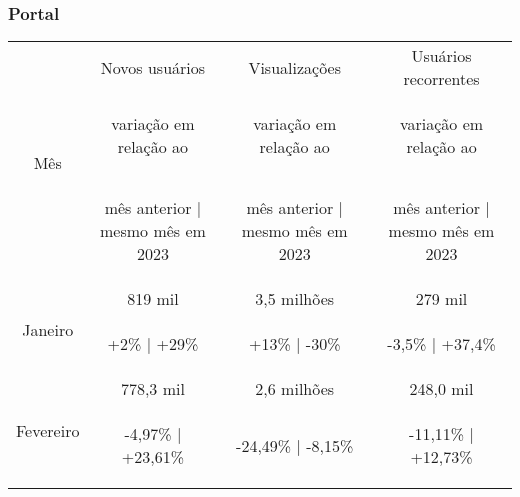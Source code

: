 \documentclass{article}%
\begin{document}
\subsubsection*{Portal}%
\label{ssubsec:Portal}%
\begin{minipage}{\textwidth}%
\centering%
\begin{tabular}{@{}|c|c|c|c|@{}}%
\toprule%
\multirow{3}{*}{Mês}&Novos usuários&Visualizações&Usuários recorrentes\\%
&\begin{footnotesize}%
variação em relação ao%
\end{footnotesize}&\begin{footnotesize}%
variação em relação ao%
\end{footnotesize}&\begin{footnotesize}%
variação em relação ao%
\end{footnotesize}\\%
&\begin{footnotesize}%
mês anterior | mesmo mês em 2023%
\end{footnotesize}&\begin{footnotesize}%
mês anterior | mesmo mês em 2023%
\end{footnotesize}&\begin{footnotesize}%
mês anterior | mesmo mês em 2023%
\end{footnotesize}\\%
\midrule%
\multirow{2}{*}{Janeiro}&819 mil&3,5 milhões&279 mil\\%
&\begin{footnotesize}%
+2\% | +29\%%
\end{footnotesize}&\begin{footnotesize}%
+13\% | {-}30\%%
\end{footnotesize}&\begin{footnotesize}%
{-}3,5\% | +37,4\%%
\end{footnotesize}\\%
\midrule%
\multirow{2}{*}{Fevereiro}&778,3 mil&2,6 milhões&248,0 mil\\%
&\begin{footnotesize}%
{-}4,97\% | +23,61\%%
\end{footnotesize}&\begin{footnotesize}%
{-}24,49\% | {-}8,15\%%
\end{footnotesize}&\begin{footnotesize}%
{-}11,11\% | +12,73\%%
\end{footnotesize}\\\bottomrule%
%
\end{tabular}%
\end{minipage}
\end{document}
